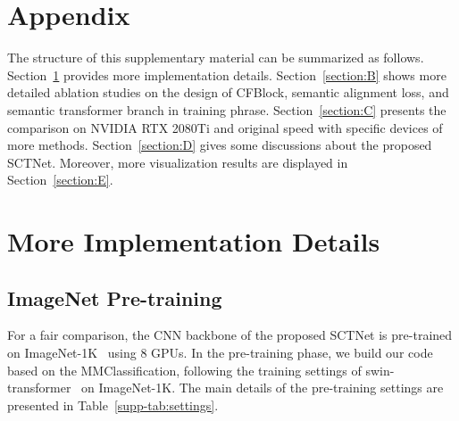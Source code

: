\documentclass[letterpaper]{article} %
\begin{document}
\section*{Appendix}
The structure of this supplementary material can be summarized as follows. Section~\ref{section:A} provides more implementation details. Section~\ref{section:B} shows more detailed ablation studies on the design of CFBlock, semantic alignment loss, and semantic transformer branch in training phrase. Section~\ref{section:C} presents the comparison on NVIDIA RTX 2080Ti and original speed with specific devices of more methods. Section~\ref{section:D} gives some discussions about the proposed SCTNet. Moreover, more visualization results are displayed in Section~\ref{section:E}.

\section{More Implementation Details}\label{section:A}
\subsection{ImageNet Pre-training}
For a fair comparison, the CNN backbone of the proposed SCTNet is pre-trained on ImageNet-1K~\cite{deng2009imagenet} using 8 GPUs. In the pre-training phase, we build our code based on the MMClassification, following the training settings of swin-transformer~\cite{liu2021swin} on ImageNet-1K. The main details of the pre-training settings are presented in Table~\ref{supp-tab:settings}.
\end{document}
